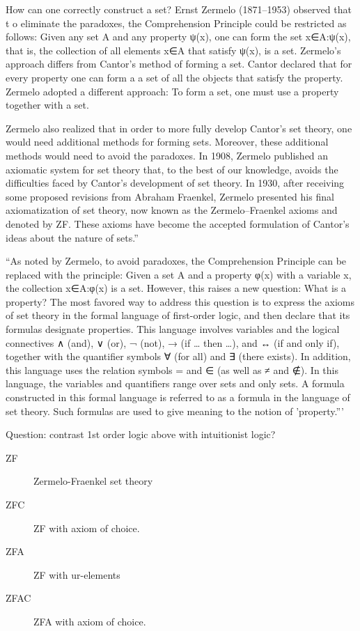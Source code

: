 How can one correctly construct a set? 
Ernst Zermelo (1871–1953) observed that t
o eliminate the paradoxes, 
the Comprehension Principle could be restricted as follows: 
Given any set A and any property ψ(x), 
one can form the set {x∈A:ψ(x)}, that is, 
the collection of all elements x∈A that satisfy ψ(x), is a set.
Zermelo’s approach differs from Cantor’s method of forming a set. 
Cantor declared that for every property one can form 
a a set of all the objects that satisfy the property.
Zermelo adopted a different approach: 
To form a set, one must use a property together with a set.

Zermelo also realized that in order to more fully develop 
Cantor’s set theory, 
one would need additional methods for forming sets. 
Moreover, these additional methods would need 
to avoid the paradoxes. 
In 1908, 
Zermelo published an axiomatic system for set theory that, 
to the best of our knowledge, 
avoids the difficulties faced by 
Cantor’s development of set theory. 
In 1930, 
after receiving some proposed revisions from Abraham Fraenkel,
 Zermelo presented his final axiomatization of set theory, 
 now known as the Zermelo–Fraenkel axioms and denoted by ZF. 
These axioms have become the accepted formulation 
of Cantor’s ideas about the nature of sets.''\cite{iep:SetTheory} 

``As noted by Zermelo, to avoid paradoxes, 
the Comprehension Principle can be replaced with the principle: 
Given a set A and a property φ(x) with a variable x, the 
collection {x∈A:φ(x)} is a set. 
However, this raises a new question: 
What is a property? 
The most favored way to address this question is to express 
the axioms of set theory
in the formal language of first-order logic, 
and then declare that its formulas designate properties. 
This language involves variables and the logical connectives
 ∧ (and), ∨ (or), ¬ (not), → (if … then …), 
 and ↔ (if and only if), 
 together with the quantifier symbols ∀ (for all) 
 and ∃ (there exists). 
 In addition, this language uses the relation symbols
  = and ∈ (as well as ≠ and ∉). 
  In this language, the variables and quantifiers range over sets 
  and only sets. 
  A formula constructed in this formal language is referred to as
   a formula in the language of set theory. Such formulas are used 
   to give meaning to the notion of 
   'property.'''\cite{iep:SetTheory}

Question: 
contrast 1st order logic above 
with intuitionist logic?\cite{wiki:IntuitionisticLogic}

\begin{description}
\item[\textsf{ZF}] Zermelo-Fraenkel set theory\cite{wiki:ZermeloFraenkelSetTheory}
\item[\textsf{ZFC}] \textsf{ZF} with axiom of choice\cite{wiki:AxiomOfChoice}.
\item[\textsf{ZFA}] \textsf{ZF} with ur-elements\cite{wiki:Urelement}
\item[\textsf{ZFAC}] \textsf{ZFA} with axiom of choice\cite{wiki:AxiomOfChoice}.
\end{description}

